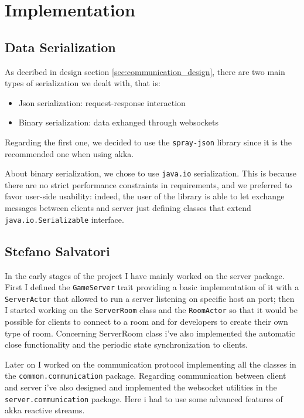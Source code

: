 \chapter{Implementation}
\section{Data Serialization}
As decribed in design section \ref{sec:communication_design}, there are two main types of serialization we dealt with, that is:
\begin{itemize}
	\item Json serialization: request-response interaction
	\item Binary serialization: data exhanged through websockets
\end{itemize}

Regarding the first one, we decided to use the \texttt{spray-json} library since it is the recommended one when using akka.

About binary serialization, we chose to use \texttt{java.io} serialization. This is because there are no strict performance constraints in requirements, and we preferred to favor user-side usability: indeed, the user of the library is able to let exchange messages between clients and server just defining classes that extend \texttt{java.io.Serializable} interface.



\section{Stefano Salvatori}
In the early stages of the project I have mainly worked on the server package. First I defined the \texttt{GameServer} trait providing a basic implementation of it with a \texttt{ServerActor} that allowed to run a server listening on specific host an port; then I started working on the \texttt{ServerRoom} class and the \texttt{RoomActor} so that it would be possible for clients to connect to a room and for developers to create their own type of room. Concerning ServerRoom class i've also implemented the automatic close functionality and the periodic state synchronization to clients.

Later on I worked on the communication protocol implementing all the classes in the \texttt{common.communication} package. Regarding communication between client and server i've also designed and implemented the websocket utilities in the \texttt{server.communication} package. Here i had to use some advanced features of akka reactive streams. 

